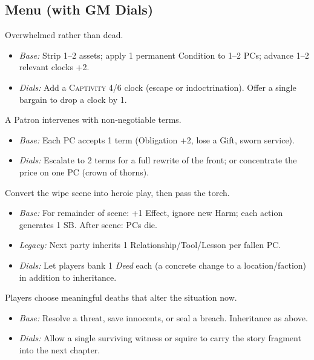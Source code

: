 \subsection*{Menu (with GM Dials)}
\begin{description}[leftmargin=1.6em]
\item[Capture & Consequences.] Overwhelmed rather than dead.
\begin{itemize}
\item \emph{Base:} Strip 1–2 assets; apply 1 permanent Condition to 1–2 PCs; advance 1–2 relevant clocks +2.
\item \emph{Dials:} Add a \textsc{Captivity} 4/6 clock (escape or indoctrination). Offer a single bargain to drop a clock by 1.
\end{itemize}

\item[Patron’s Claim.] A Patron intervenes with non‑negotiable terms.
\begin{itemize}
\item \emph{Base:} Each PC accepts 1 term (Obligation +2, lose a Gift, sworn service).
\item \emph{Dials:} Escalate to 2 terms for a full rewrite of the front; or concentrate the price on one PC (crown of thorns).
\end{itemize}

\item[Last Stand \textrightarrow{} Legacy.] Convert the wipe scene into heroic play, then pass the torch.
\begin{itemize}
\item \emph{Base:} For remainder of scene: +1 Effect, ignore new Harm; each action generates 1 SB. After scene: PCs die.
\item \emph{Legacy:} Next party inherits 1 Relationship/Tool/Lesson per fallen PC.
\item \emph{Dials:} Let players bank 1 \emph{Deed} each (a concrete change to a location/faction) in addition to inheritance.
\end{itemize}

\item[Dramatic Exit & Inheritance.] Players choose meaningful deaths that alter the situation now.
\begin{itemize}
\item \emph{Base:} Resolve a threat, save innocents, or seal a breach. Inheritance as above.
\item \emph{Dials:} Allow a single surviving witness or squire to carry the story fragment into the next chapter.
\end{itemize}


\end{description}
